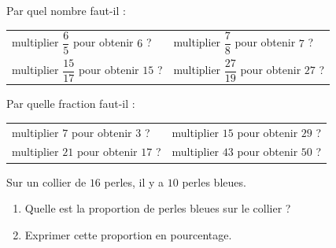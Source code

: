 \documentclass[a4paper,10pt]{report}
\begin{document}
\begin{ex}
Par quel nombre faut-il :
\begin{enumerate}[font=\color{exer1}]
\begin{tabular}{m{7cm}m{7cm}}
\item multiplier $\dfrac{6}{5}$ pour obtenir $6$ ?&
\item multiplier $\dfrac{7}{8}$ pour obtenir $7$ ?\\
\item multiplier $\dfrac{15}{17}$ pour obtenir $15$ ?&
\item multiplier $\dfrac{27}{19}$ pour obtenir $27$ ?\\
\end{tabular}
\end{enumerate}
\end{ex}

\begin{ex}
Par quelle fraction faut-il :
\begin{enumerate}[font=\color{exer2}]
\begin{tabular}{m{7cm}m{7cm}}
\item multiplier $7$ pour obtenir $3$ ?&
\item multiplier $15$ pour obtenir $29$ ?\\
\item multiplier $21$ pour obtenir $17$ ?&
\item multiplier $43$ pour obtenir $50$ ?\\
\end{tabular}
\end{enumerate}
\end{ex}


\begin{ex}
Sur un collier de $16$ perles, il y a $10$ perles bleues.
\begin{enumerate}[font=\color{exer1}]
\item Quelle est la proportion de perles bleues sur le collier ?
\item Exprimer cette proportion en pourcentage.
\end{enumerate}
\end{ex}
\end{document}

